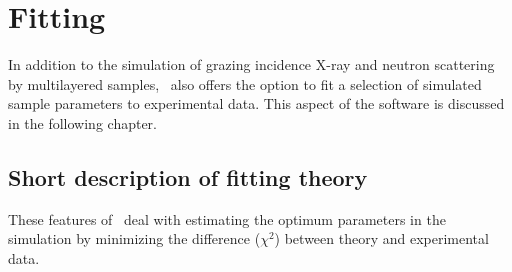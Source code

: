 \newpage
\chapter{Fitting} \label{Fittingchap}


In addition to the simulation of grazing incidence
X-ray and neutron scattering by
multilayered samples, \BornAgain\ also offers the option to
fit a selection of simulated sample parameters to experimental data.  This aspect
of the software is discussed in the following chapter.

\section{Short description of fitting theory}

These features of \BornAgain\ deal with estimating the optimum parameters
in the simulation by minimizing the difference ($\chi^2$) between theory and experimental data.\\


\\


